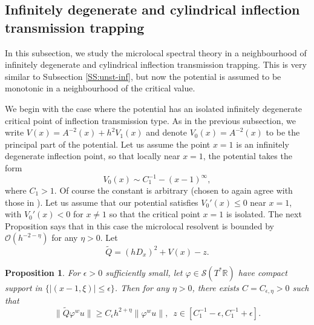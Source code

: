 \documentclass[twoside, final]{amsart}
\newtheorem{proposition}{Proposition}[section]
\theoremstyle{definition}
\numberwithin{equation}{section}
\begin{document}
\subsection{Infinitely degenerate and cylindrical inflection
  transmission trapping}

\label{SS:inf-deg-infl}

In this subsection, we study the microlocal spectral theory in a
neighbourhood of infinitely degenerate and cylindrical inflection
transmission trapping.  This is very similar to Subsection \ref{SS:unst-inf},
but now the potential is assumed to be monotonic in a neighbourhood of
the critical value.  

We begin with the case where the potential has an isolated
infinitely degenerate critical point of inflection transmission type.
As in the previous subsection, we write $V(x) = A^{-2}(x) + h^2
V_1(x)$ and denote $V_0(x) = A^{-2}(x)$ to be the principal part of
the potential.  
Let us assume the point $x = 1$ is
an infinitely degenerate inflection point, so that locally near $x = 1$,
the potential takes the form
\[
V_0(x) \sim C_1^{-1} - (x-1)^{\infty}, 
\]
where $C_1>1$.  Of course the constant is arbitrary
(chosen to again agree with those in \cite{ChMe-lsm}).  Let us assume
that our potential satisfies $V_0'(x) {\leqslant} 0$ near $x = 1$, with
$V_0'(x)<0$ for $x \neq 1$ so that the critical point $x = 1$ is isolated.
The next Proposition says that in this case the microlocal resolvent is
bounded by ${{\mathcal O}}(h^{-2-\eta})$ for any $\eta>0$.  Let 
\[
{\widetilde{Q}} = (hD_x)^2 + V(x) -z.
\]

\begin{proposition}
\label{P:ml-inv-4a}
For $\epsilon>0$ sufficiently small, let ${\varphi} \in {{\mathcal S}}(T^* {{\mathbb R}})$
have compact support in $\{ |(x-1,\xi) |{\leqslant} \epsilon\}$.  Then for
any $\eta>0$, there
exists $C = C_{\epsilon,\eta}>0$ such that 
\begin{equation}
\label{E:ml-inv-4a}
\| {\widetilde{Q}} {\varphi}^w u \| {\geqslant} C_\epsilon {h^{2 + \eta}} \|
{\varphi}^w u \|, \,\,\, z \in  [C_1^{-1}-\epsilon, C_1^{-1} + \epsilon].
\end{equation}
\end{proposition}
\end{document}
